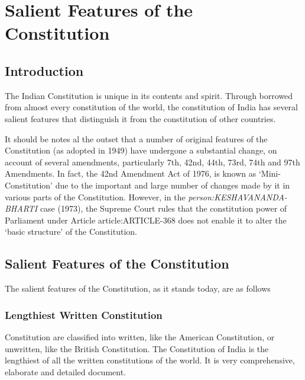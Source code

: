 \printendnotes
\cleardoublepage

%

\chapter{Salient Features of the Constitution}

\begin{multicols}{2}

\section{Introduction}

The Indian Constitution is unique in its contents and spirit. Through borrowed from almost every constitution of the world, the constitution of India has several salient features that distinguish it from the constitution of other countries.

It should be notes al the outset that a number of original features of the Constitution (as adopted in 1949) have undergone a substantial change, on account of several amendments, particularly 7th, 42nd, 44th, 73rd, 74th and 97th Amendments. In fact, the 42nd Amendment Act of 1976, is known as `Mini-Constitution' due to the important and large number of changes made by it in various parts of the Constitution. However, in the { \textit{\gls{person:KESHAVANANDA-BHARTI}}} case (1973), the Supreme Court rules that the constitution power of Parliament under Article \gls{article:ARTICLE-368} does not enable it to alter the `basic structure' of the Constitution.

\section{Salient Features of the Constitution}

The salient features of the Constitution, as it stands today, are as follows

\subsection{Lengthiest Written Constitution}

Constitution are classified into written, like the American Constitution, or unwritten, like the British Constitution. The Constitution of India is the lengthiest of all the written constitutions of the world. It is very comprehensive, elaborate and detailed document.


\end{multicols}
